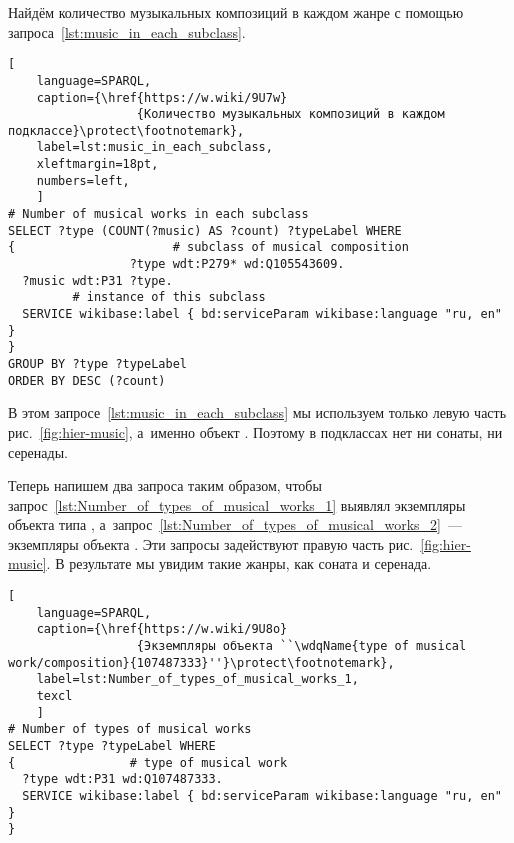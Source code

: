 Найдём количество музыкальных композиций в каждом жанре с помощью запроса~\ref{lst:music_in_each_subclass}.

\begin{lstlisting}[ 
    language=SPARQL,
    caption={\href{https://w.wiki/9U7w}
                  {Количество музыкальных композиций в каждом подклассе}\protect\footnotemark},
    label=lst:music_in_each_subclass,
    xleftmargin=18pt,
    numbers=left,
    ]
# Number of musical works in each subclass
SELECT ?type (COUNT(?music) AS ?count) ?typeLabel WHERE 
{                      # subclass of musical composition
                 ?type wdt:P279* wd:Q105543609.      
  ?music wdt:P31 ?type.
         # instance of this subclass
  SERVICE wikibase:label { bd:serviceParam wikibase:language "ru, en" }
}
GROUP BY ?type ?typeLabel
ORDER BY DESC (?count)
\end{lstlisting}%


В этом запросе~\ref{lst:music_in_each_subclass} 
мы используем только левую часть рис.~\ref{fig:hier-music}, 
а~именно объект . 
Поэтому в подклассах нет ни сонаты, ни серенады.

Теперь напишем два запроса таким образом, 
чтобы запрос~\ref{lst:Number_of_types_of_musical_works_1} выявлял экземпляры объекта типа 
, 
а~запрос~\ref{lst:Number_of_types_of_musical_works_2}~--- 
экземпляры объекта . 
Эти запросы задействуют правую часть рис.~\ref{fig:hier-music}. В результате мы увидим такие жанры, как соната и серенада.

\begin{lstlisting}[ 
    language=SPARQL,
    caption={\href{https://w.wiki/9U8o}
                  {Экземпляры объекта ``\wdqName{type of musical work/composition}{107487333}''}\protect\footnotemark},
    label=lst:Number_of_types_of_musical_works_1,
    texcl
    ]
# Number of types of musical works
SELECT ?type ?typeLabel WHERE 
{                # type of musical work
  ?type wdt:P31 wd:Q107487333.      
  SERVICE wikibase:label { bd:serviceParam wikibase:language "ru, en" }
}
\end{lstlisting}%

